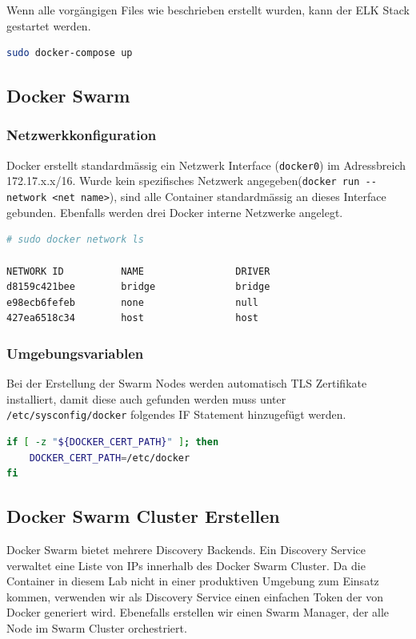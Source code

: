 Wenn alle vorgängigen Files wie beschrieben erstellt wurden, kann der ELK Stack gestartet werden.
\begin{lstlisting}[language=bash]
sudo docker-compose up
\end{lstlisting}


\subsection{Docker Swarm}
\subsubsection{Netzwerkkonfiguration}
Docker erstellt standardmässig ein Netzwerk Interface (\lstinline[]|docker0|) im Adressbreich 172.17.x.x/16. Wurde kein spezifisches Netzwerk angegeben(\lstinline[]|docker run --network <net name>|), sind alle Container standardmässig an dieses Interface gebunden. Ebenfalls werden drei Docker interne Netzwerke angelegt.
\begin{lstlisting}[language=bash]
# sudo docker network ls

NETWORK ID          NAME                DRIVER
d8159c421bee        bridge              bridge              
e98ecb6fefeb        none                null                
427ea6518c34        host                host    
\end{lstlisting}

\subsubsection{Umgebungsvariablen}
Bei der Erstellung der Swarm Nodes werden automatisch TLS Zertifikate installiert, damit diese auch gefunden werden muss unter \lstinline[]|/etc/sysconfig/docker| folgendes IF Statement hinzugefügt werden. 
\begin{lstlisting}[caption=/etc/sysconfig/docker, language=bash]
if [ -z "${DOCKER_CERT_PATH}" ]; then
	DOCKER_CERT_PATH=/etc/docker
fi
\end{lstlisting}

\subsection{Docker Swarm Cluster Erstellen}
Docker Swarm bietet mehrere Discovery Backends. Ein Discovery Service verwaltet eine Liste von IPs innerhalb des Docker Swarm Cluster. Da die Container in diesem Lab nicht in einer produktiven Umgebung zum Einsatz kommen, verwenden wir als Discovery Service einen einfachen Token der von Docker generiert wird. Ebenefalls erstellen wir einen Swarm Manager, der alle Node im Swarm Cluster orchestriert.


